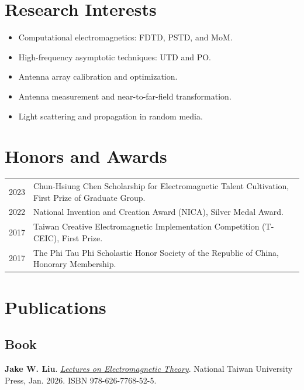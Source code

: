 \documentclass[11pt,a4paper]{article}
\newcommand{\name}{\textbf{Jake W. Liu}}
\begin{document}
\section*{Research Interests}
\begin{itemize}
  \item Computational electromagnetics: FDTD, PSTD, and MoM.
  \item High-frequency asymptotic techniques: UTD and PO.
  \item Antenna array calibration and optimization.
  \item Antenna measurement and near-to-far-field transformation.
  \item Light scattering and propagation in random media.
\end{itemize}

\section*{Honors and Awards}
\begin{tabularx}{\textwidth}{@{}r X@{}}
2023 & Chun-Hsiung Chen Scholarship for Electromagnetic Talent Cultivation, First Prize of Graduate Group.\\
2022 & National Invention and Creation Award (NICA), Silver Medal Award.\\
2017 & Taiwan Creative Electromagnetic Implementation Competition (T-CEIC), First Prize.\\
2017 & The Phi Tau Phi Scholastic Honor Society of the Republic of China, Honorary Membership.\\
\end{tabularx}

\section*{Publications}

\subsection*{Book}
\begin{enumerate}[label={[B\arabic*]}]
  \item \name. \textit{\href{https://press.ntu.edu.tw/tw/publish/show.php?act=book\&refer=ntup_book01502}{Lectures on Electromagnetic Theory}}. National Taiwan University Press, Jan. 2026. ISBN 978-626-7768-52-5.
\end{enumerate}
\end{document}
